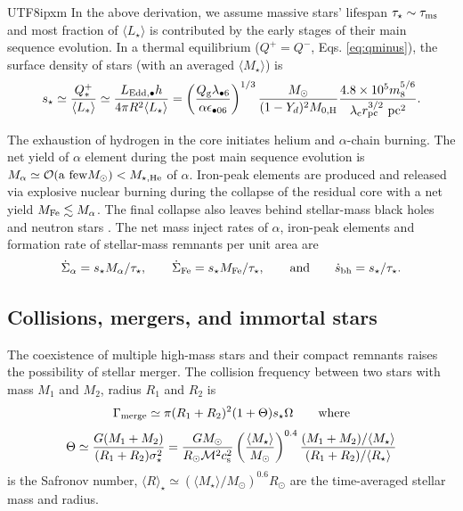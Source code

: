\documentclass[linenumbers,trackchanges]{aastex701}
\begin{document}
\begin{CJK*}{UTF8}{ipxm}
In the above derivation, we assume massive stars' lifespan
$\tau_\star \sim \tau_{\rm ms}$ and most fraction of 
$\langle L_\star \rangle$ is contributed by the early 
stages of their main sequence evolution. 
In a thermal equilibrium ($Q^+=Q^-$, Eqs. \ref{eq:qminus}), 
the surface density of stars (with an averaged $\langle M_\star 
\rangle$) is
\begin{equation}
    s_\star \simeq {Q^+ _\ast \over \langle L_\ast \rangle}
    \simeq  {L_{\rm Edd, \bullet} h \over 4 \pi R^2  
    \langle L_\star \rangle} = \left( {Q_{\rm g}  \lambda_{\bullet 6} \over \alpha \epsilon_{\bullet 06}} \right)^{1/3}
    {M_\odot \over (1-Y_d)^2 M_{0, \rm H}}
    {4.8 \times 10^5 m_8 ^{5/6} \over \lambda_{\rm c} r_{\rm pc} 
    ^{3/2} \ {\rm pc}^2 }.
    \label{eq:surfacestar}
\end{equation}

The exhaustion of hydrogen in the core initiates
helium and $\alpha$-chain burning. The net yield 
of $\alpha$ element during the post main sequence 
evolution is $M_\alpha \simeq {\mathcal O} ({\rm a \ few}
M_\odot) < M_{\star, \rm He}$ of $\alpha$.  Iron-peak
elements are produced and released via explosive 
nuclear burning during the collapse of the residual
core with a net yield $M_{\rm Fe} \lesssim M_{\alpha}$.
The final collapse also leaves behind stellar-mass 
black holes and neutron stars \citep{fryer2025}.
The net mass inject rates of $\alpha$, iron-peak elements
and formation rate of stellar-mass remnants per unit area are 
\begin{equation}
    {\dot \Sigma}_{\alpha} = s_\star M_\alpha/\tau_\star, 
    \ \ \ \ \ \ 
    {\dot \Sigma}_{\rm Fe} = s_\star M_{\rm Fe}/\tau_\star,
    \ \ \ \ \ \  {\rm and} \ \ \ \ \ \ 
    {\dot s}_{\rm bh} = s_\star/\tau_\star.
\end{equation}

\subsection{Collisions, mergers, and immortal stars}
The coexistence of multiple high-mass stars and their 
compact remnants raises the possibility of stellar merger.  
The collision frequency between two stars with mass 
$M_1$ and $M_2$, radius $R_1$ and $R_2$ is 
\begin{equation}
\Gamma_{\rm merge} \simeq \pi (R_1 + R_2)^2 (1+ \Theta) s_\star \Omega \ \ \ \ \ \ {\rm where}
\label{eq:collisionfreq}
\end{equation}
\begin{equation}
\Theta \simeq {G (M_1+M_2) \over (R_1+R_2) \sigma_\star^2}
={G M_\odot \over R_\odot {\mathcal M}^2 c_{\rm s}^2} \left( {
\langle M_\star \rangle \over M_\odot}\right)^{0.4} 
{(M_1+M_2)/{\langle M_\star \rangle} 
\over (R_1+R_2)/{\langle R_\star \rangle}}
\end{equation}
is the Safronov number, ${\langle R \rangle}_\star 
\simeq (\langle M_\star \rangle /M_\odot)^{0.6} 
R_\odot$ are the time-averaged stellar mass and radius.


\end{CJK*}
\end{document}
